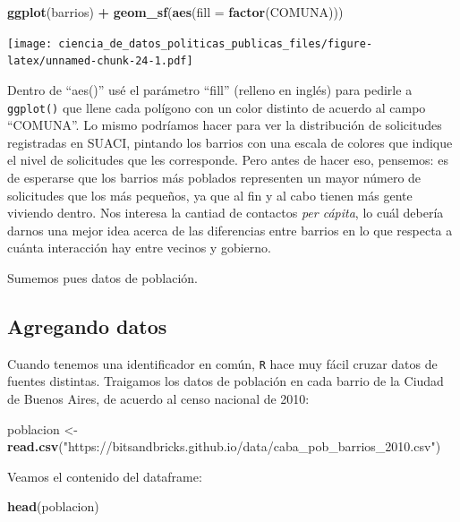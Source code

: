 \documentclass[]{book}
\newenvironment{Shaded}{\begin{snugshade}}{\end{snugshade}}
\newcommand{\KeywordTok}[1]{\textcolor[rgb]{0.13,0.29,0.53}{\textbf{#1}}}
\newcommand{\DataTypeTok}[1]{\textcolor[rgb]{0.13,0.29,0.53}{#1}}
\newcommand{\StringTok}[1]{\textcolor[rgb]{0.31,0.60,0.02}{#1}}
\newcommand{\OperatorTok}[1]{\textcolor[rgb]{0.81,0.36,0.00}{\textbf{#1}}}
\newcommand{\NormalTok}[1]{#1}
\begin{document}
\begin{Shaded}
\begin{Highlighting}[]
\KeywordTok{ggplot}\NormalTok{(barrios) }\OperatorTok{+}
\StringTok{    }\KeywordTok{geom_sf}\NormalTok{(}\KeywordTok{aes}\NormalTok{(}\DataTypeTok{fill =} \KeywordTok{factor}\NormalTok{(COMUNA)))}
\end{Highlighting}
\end{Shaded}

\texttt{[image: ciencia\_de\_datos\_politicas\_publicas\_files/figure-latex/unnamed-chunk-24-1.pdf]}

Dentro de ``aes()'' usé el parámetro ``fill'' (relleno en inglés) para
pedirle a \texttt{ggplot()} que llene cada polígono con un color
distinto de acuerdo al campo ``COMUNA''. Lo mismo podríamos hacer para
ver la distribución de solicitudes registradas en SUACI, pintando los
barrios con una escala de colores que indique el nivel de solicitudes
que les corresponde. Pero antes de hacer eso, pensemos: es de esperarse
que los barrios más poblados representen un mayor número de solicitudes
que los más pequeños, ya que al fin y al cabo tienen más gente viviendo
dentro. Nos interesa la cantiad de contactos \emph{per cápita}, lo cuál
debería darnos una mejor idea acerca de las diferencias entre barrios en
lo que respecta a cuánta interacción hay entre vecinos y gobierno.

Sumemos pues datos de población.

\subsection{Agregando datos}\label{agregando-datos}

Cuando tenemos una identificador en común, \texttt{R} hace muy fácil
cruzar datos de fuentes distintas. Traigamos los datos de población en
cada barrio de la Ciudad de Buenos Aires, de acuerdo al censo nacional
de 2010:

\begin{Shaded}
\begin{Highlighting}[]
\NormalTok{poblacion <-}\StringTok{ }\KeywordTok{read.csv}\NormalTok{(}\StringTok{"https://bitsandbricks.github.io/data/caba_pob_barrios_2010.csv"}\NormalTok{)}
\end{Highlighting}
\end{Shaded}

Veamos el contenido del dataframe:

\begin{Shaded}
\begin{Highlighting}[]
\KeywordTok{head}\NormalTok{(poblacion)}
\end{Highlighting}
\end{Shaded}
\end{document}
